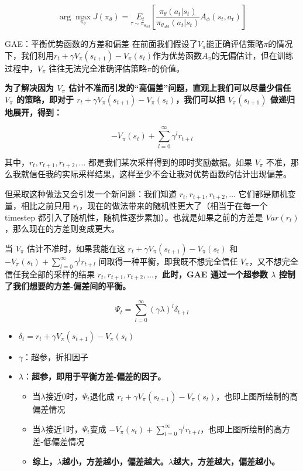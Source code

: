 \documentclass[UTF8,fontset=fandol]{ctexart}
\begin{document}
\[
\arg \max_{\pi_\theta} J(\pi_\theta) = \underset{\tau \sim \pi_{\theta_{old}}}{E_t} \left[ \frac{\pi_\theta(a_t|s_t)}{\pi_{\theta_{old}}(a_t|s_t)} A_\phi(s_t, a_t) \right]
\]

GAE：平衡优势函数的方差和偏差
在前面我们假设了\(V_\pi\)能正确评估策略\(\pi\)的情况下，我们利用\(r_t + \gamma V_\pi(s_{t+1}) - V_\pi(s_t)\)作为优势函数\(A_\pi\)的无偏估计，但在训练过程中，\(V_\pi\) 往往无法完全准确评估策略\(\pi\)的价值。

\textbf{为了解决因为 \(V_\pi\) 估计不准而引发的“高偏差”问题，直观上我们可以尽量少信任 \(V_\pi\) 的策略，即对于 \(r_t + \gamma V_\pi(s_{t+1}) - V_\pi(s_t)\)，我们可以把 \(V_\pi(s_{t+1})\) 做递归地展开，得到：}

\[
-V_\pi(s_t) + \sum_{l=0}^{\infty} \gamma^l r_{t+l}
\]

其中，\(r_t, r_{t+1}, r_{t+2}, \dots\) 都是我们某次采样得到的即时奖励数据。如果 \(V_\pi\) 不准，那么我就信任我的实际采样结果，这样至少不会让我对优势函数的估计出现偏差。

但采取这种做法又会引发一个新问题：我们知道 \(r_t, r_{t+1}, r_{t+2}, \dots\) 它们都是随机变量，相比之前只用 \(r_t\)，现在的做法带来的随机性更大了（相当于在每一个 timestep 都引入了随机性，随机性逐步累加）。也就是如果之前的方差是 \(Var(r_t)\)，那么现在的方差则变成更大。

当 \(V_\pi\) 估计不准时，如果我能在这 \(r_t + \gamma V_\pi(s_{t+1}) - V_\pi(s_t)\) 和 \(-V_\pi(s_t) + \sum_{l=0}^{\infty} \gamma^l r_{t+l}\) 间取得一种平衡，即我既不想完全信任 \(V_\pi\)，又不想完全信任我全部的采样的结果 \(r_t, r_{t+1}, r_{t+2}, \dots\)，\textbf{此时，GAE 通过一个超参数 \(\lambda\) 控制了我们想要的方差-偏差间的平衡。}

\[
\Psi_t = \sum_{l=0}^{\infty} (\gamma\lambda)^l \delta_{t+l}
\]

\begin{itemize}
\item \(\delta_t = r_t + \gamma V_\pi(s_{t+1}) - V_\pi(s_t)\)
\item \(\gamma\)：超参，折扣因子
\item \(\lambda\)：\textbf{超参，即用于平衡方差-偏差的因子。}
\begin{itemize}
\item 当\(\lambda\)接近0时，\(\Psi_t\)退化成 \(r_t + \gamma V_\pi(s_{t+1}) - V_\pi(s_t)\)，也即上图所绘制的高偏差情况
\item 当\(\lambda\)接近1时，\(\Psi_t\)变成 \(-V_\pi(s_t) + \sum_{l=0}^{\infty} \gamma^l r_{t+l}\)，也即上图所绘制的高方差-低偏差情况
\item \textbf{综上，\(\lambda\)越小，方差越小，偏差越大。\(\lambda\)越大，方差越大，偏差越小。}
\end{itemize}
\end{itemize}
\end{document}
